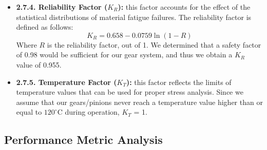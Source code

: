 \documentclass[letterpaper,12pt]{article}
\begin{document}
\begin{itemize}[leftmargin=3mm]
    \item \textbf{2.7.4. Reliability Factor ($K_R$):} this factor accounts for the effect of the statistical distributions of material fatigue failures. The reliability factor is defined as follows:
    \begin{equation}
    K_R = 0.658-0.0759\ln{(1-R)}
    \end{equation}
    Where $R$ is the reliability factor, out of 1. We determined that a safety factor of 0.98 would be sufficient for our gear system, and thus we obtain a $K_R$ value of 0.955.
    
    \item \textbf{2.7.5. Temperature Factor ($K_T$):} this factor reflects the limits of temperature values that can be used for proper stress analysis. Since we assume that our gears/pinions never reach a temperature value higher than or equal to $120^\circ$C during operation, $K_T$ = 1.
\end{itemize}

\subsection{Performance Metric Analysis}
\end{document}
